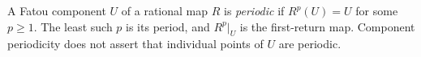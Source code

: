 
A Fatou component $U$ of a rational map $R$ is \emph{periodic} if $R^p(U)=U$ for some $p\ge1$. The least such $p$ is its period, and $R^p|_U$ is the first-return map. Component periodicity does not assert that individual points of $U$ are periodic.
